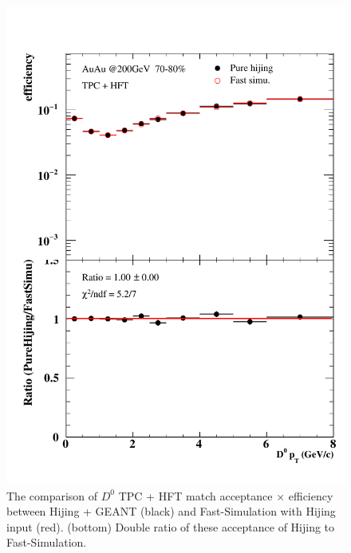 \begin{figure}[htbp]
\begin{minipage}[htbp]{0.47\linewidth}
\centering
\includegraphics[width=1.0\textwidth,angle=0]{figure/Run14_D0HFT/70_80_2.pdf}
\caption{ The comparison of $D^0$ TPC + HFT match acceptance $\times$ efficiency between Hijing + GEANT (black) and Fast-Simulation with Hijing input (red). (bottom) Double ratio of these acceptance of Hijing to Fast-Simulation.\label{70_80_2}}
\end{minipage}
\hfill
\end{figure}

